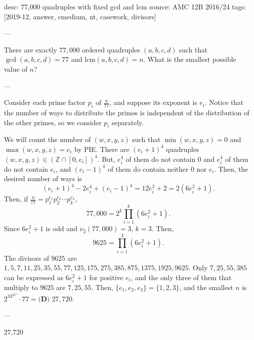 desc: 77,000 quadruples with fixed gcd and lcm
source: AMC 12B 2016/24
tags: [2019-12, answer, cmedium, nt, casework, divisors]

---

There are exactly $77,000$ ordered quadruples $(a,b,c,d)$ such that $\gcd(a,b,c,d)=77$ and $\text{lcm}(a,b,c,d)=n$. What is the smallest possible value of $n$?

---

Consider each prime factor $p_i$ of $\frac{n}{77}$, and suppose its exponent is $e_i$. Notice that the number of ways to distribute the primes is independent of the distribution of the other primes, so we consider $p_i$ separately.

We will count the number of $(w,x,y,z)$ such that $\min(w,x,y,z)=0$ and $\max(w,x,y,z)=e_i$ by PIE. There are $(e_i+1)^4$ quadruples $(w,x,y,z)\in(\mathbb{Z}\cap[0,e_i])^4$. But, $e_i^4$ of them do not contain $0$ and $e_i^4$ of them do not contain $e_i$, and $(e_i-1)^4$ of them do contain neither $0$ nor $e_i$. Then, the desired number of ways is \[(e_i+1)^4-2e_i^4+(e_i-1)^4=12e_i^2+2=2(6e_i^2+1).\]
Then, if $\frac{n}{77}=p_1^{e_1}p_2^{e_2}\cdots p_k^{e_k}$, \[77,000=2^k\prod_{i=1}^k(6e_i^2+1).\]
Since $6e_i^2+1$ is odd and $\nu_2(77,000)=3$, $k=3$. Then, \[9625=\prod_{i=1}^3(6e_i^2+1).\]
The divisors of $9625$ are $1,5,7,11,25,35,55,77,125,175,275,385,875,1375,1925,9625$. Only $7,25,55,385$ can be expressed as $6e_i^2+1$ for positive $e_i$, and the only three of them that multiply to $9625$ are $7,25,55$. Then, $\{e_1,e_2,e_3\}=\{1,2,3\}$, and the smallest $n$ is $2^33^25^1\cdot 77=\boxed{\textbf{(D) }27,720}$.

---

27,720
